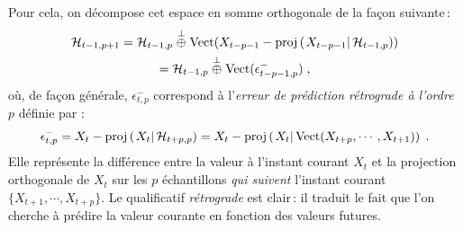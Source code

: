 Pour cela, on d\'ecompose cet espace
en somme orthogonale de la fa\c{c}on suivante\,:
\begin{multline*}
\cH_{t-1,p+1} = \cH_{t-1,p}  \oplusperp \lspan{ X_{t-p-1} -\proj{X_{t-p-1}}{\cH_{t-1,p}}}
\\= \cH_{t-1,p} \oplusperp \lspan{\epsilon_{t-p-1,p}^-}\;,
\end{multline*}
o\`u, de fa\c{c}on g\'en\'erale, $\epsilon_{t,p}^-$ correspond \`a
l'\emph{erreur de pr\'ediction
r\'etrograde \`a l'ordre $p$} d\'efinie par :
\[
\epsilon_{t,p}^-
     = X_t - \proj{X_t}{\cH_{t+p,p}}
     = X_t - \proj{X_t}{\lspan{X_{t+p}, \cdots, X_{t+1}}}\;.
\]
Elle repr\'esente la diff\'erence entre la valeur \`a l'instant courant $X_t$ et
la projection orthogonale de $X_t$ sur les $p$ \'echantillons
\emph{qui suivent} l'instant courant $\{X_{t+1}, \cdots, X_{t+p}\}$.
Le qualificatif \emph{r\'etrograde} est clair\,: il
traduit le fait que l'on cherche \`a pr\'edire la valeur courante
en fonction des valeurs futures.


